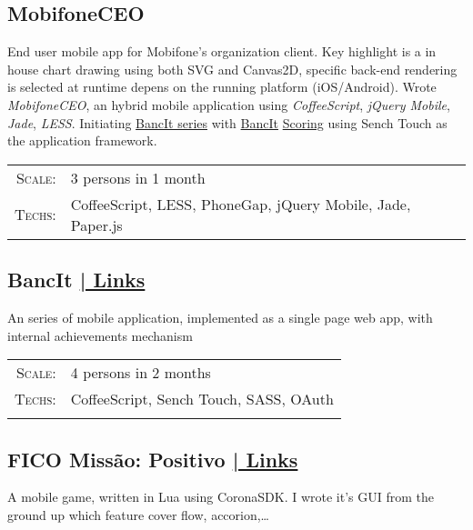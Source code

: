 \documentclass[a4paper,10pt]{article}
\begin{document}
\subsection*{MobifoneCEO}

End user mobile app for Mobifone's organization client. Key highlight is a in house chart drawing using both SVG and Canvas2D, specific back-end rendering is selected at runtime depens on the running platform (iOS/Android).
Wrote \textit{MobifoneCEO}, an hybrid mobile application using \textit{CoffeeScript}, \textit{jQuery Mobile}, \textit{Jade}, \textit{LESS}. Initiating \href{http://bankerslab.com/banc-it/}{BancIt series} with \href{https://itunes.apple.com/us/app/bancit-scoring/id599922020?mt=8}{BancIt} \href{https://play.google.com/store/apps/details?id=com.bankerslab.scoring&hl=en}{Scoring} using Sench Touch as the application framework.

\begin{tabular}{rl}
    \textsc{Scale:} & 3 persons in 1 month\\
    \textsc{Techs:} & CoffeeScript, LESS, PhoneGap, jQuery Mobile, Jade, Paper.js\\
\end{tabular}

\subsection*{BancIt \hfill \hyperlink{bancit-links}{ | \footnotesize Links}}

An series of mobile application, implemented as a single page web app, with internal achievements mechanism

\begin{tabular}{rl}
    \textsc{Scale:} & 4 persons in 2 months\\
    \textsc{Techs:} & CoffeeScript, Sench Touch, SASS, OAuth\\
    \\
    
\end{tabular}

\subsection*{FICO Missão: Positivo \hfill \hyperlink{missao-links} { | \footnotesize Links}}

A mobile game, written in Lua using CoronaSDK. I wrote it's GUI from the ground up which feature cover flow, accorion,\ldots
\end{document}
